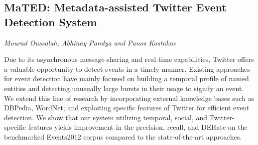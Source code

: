 \documentclass[../booklet.tex]{subfiles}
\begin{document}
\subsection[MaTED: Metadata-assisted Twitter Event Detection System. {\it Mourad Oussalah, Abhinay Pandya and Panos Kostakos}]{MaTED: Metadata-assisted Twitter Event Detection System}
  

\begin{center}
  {\it Mourad Oussalah, Abhinay Pandya and Panos Kostakos}
\end{center}

\vskip 0.8cm


Due to its asynchronous message-sharing and real-time capabilities, Twitter offers a valuable opportunity to detect events in a timely manner. Existing approaches for event detection have mainly focused on building a temporal profile of named entities and detecting unusually large bursts in their usage to signify an event. We extend this line of research by incorporating external knowledge bases such as DBPedia, WordNet; and exploiting specific features of Twitter for efficient event detection. We show that our system utilizing temporal, social, and Twitter-specific features yields improvement in the precision, recall, and DERate on the benchmarked Events2012 corpus compared to the state-of-the-art approaches.

\end{document}
